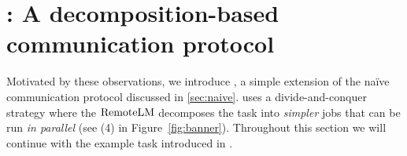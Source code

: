 


\vspace{-1em}\section{\system: A decomposition-based communication protocol}
\label{sec:methods}


Motivated by these observations, we introduce \system, a simple extension of the naïve communication protocol discussed in \cref{sec:naive}.
\system uses a divide-and-conquer strategy where the $\mathrm{RemoteLM}$ decomposes the task into \textit{simpler} jobs that can be run \textit{in parallel} (see (4) in Figure~\ref{fig:banner}). 
% 
Throughout this section we will continue with the example task introduced in .


\vspace{-0.5em}
